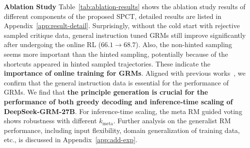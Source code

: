 \documentclass{article} %
\newcommand{\SGRM}{DeepSeek-GRM-27B\xspace}
\newcommand{\SGRMSmall}{DeepSeek-GRM-16B\xspace}
\newcommand{\BTRM}{DeepSeek-BTRM\xspace}
\begin{document}

\noindent\textbf{Ablation Study}
Table~\ref{tab:ablation-results} shows the ablation study results of different components of the proposed SPCT, detailed results are listed in Appendix~\ref{app:result-detail}. Surprisingly, without the cold start with rejective sampled critique data, general instruction tuned GRMs still improve significantly after undergoing the online RL ($66.1\rightarrow 68.7$). Also, the non-hinted sampling seems more important than the hinted sampling, potentially because of the shortcuts appeared in hinted sampled trajectories. These indicate the \textbf{importance of online training for GRMs}. Aligned with previous works~\citep{cao2024compassjudger1allinonejudgemodel}, we confirm that the general instruction data is essential for the performance of GRMs. We find that \textbf{the principle generation is crucial for the performance of both greedy decoding and inference-time scaling of \SGRM}. For inference-time scaling, the meta RM guided voting shows robustness with different $k_{\mathrm{meta}}$. Further analysis on the generalist RM performance, including input flexibility, domain generalization of training data, etc., is discussed in Appendix~\ref{app:add-exp}. 
\end{document}
